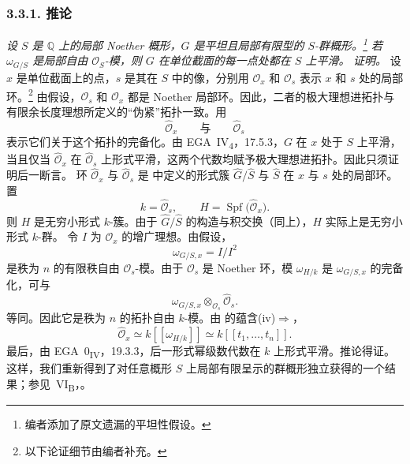 
\subsubsection*{3.3.1. 推论}
\label{sga3:VIIB:3.3.1}
{\itshape 设 \(S\) 是 \(\mathbb Q\) 上的局部 Noether 概形，\(G\) 是平坦且局部有限型的 \(S\)-群概形。\footnote{%
\label{sga3:VIIB:nde:129}编者添加了原文遗漏的平坦性假设。}
若 \(\omega_{G/S}\) 是局部自由 \(\mathcal O_S\)-模，则 \(G\) 在单位截面的每一点处都在 \(S\) 上平滑。}
\textit{证明。}
设 \(x\) 是单位截面上的点，\(s\) 是其在 \(S\) 中的像，分别用 \(\mathcal O_x\) 和 \(\mathcal O_s\) 表示 \(x\) 和 \(s\) 处的局部环。\footnote{%
\label{sga3:VIIB:nde:130}以下论证细节由编者补充。}
由假设，\(\mathcal O_s\) 和 \(\mathcal O_x\) 都是 Noether 局部环。因此，二者的极大理想进拓扑与有限余长度理想所定义的“伪紧”拓扑一致。用
\[
  \widehat{\mathcal O}_x
  \qquad\text{与}\qquad
  \widehat{\mathcal O}_s
\]
表示它们关于这个拓扑的完备化。由 EGA~IV\textsubscript{4}，17.5.3，\(G\) 在 \(x\) 处于 \(S\) 上平滑，当且仅当 \(\widehat{\mathcal O}_x\) 在 \(\widehat{\mathcal O}_s\) 上形式平滑，这两个代数均赋予极大理想进拓扑。因此只须证明后一断言。
环 \(\widehat{\mathcal O}_x\) 与 \(\widehat{\mathcal O}_s\) 是  中定义的形式簇 \(\widehat G/\widehat S\) 与 \(\widehat S\) 在 \(x\) 与 \(s\) 处的局部环。置
\[
  k=\widehat{\mathcal O}_s,
  \qquad
  H=\operatorname{Spf}\bigl(\widehat{\mathcal O}_x\bigr).
\]
则 \(H\) 是无穷小形式 \(k\)-簇。由于 \(\widehat G/\widehat S\) 的构造与积交换\textup{（同上）}，\(H\) 实际上是无穷小形式 \(k\)-群。
令 \(I\) 为 \(\mathcal O_x\) 的增广理想。由假设，
\[
  \omega_{G/S,x}=I/I^2
\]
是秩为 \(n\) 的有限秩自由 \(\mathcal O_s\)-模。由于 \(\mathcal O_s\) 是 Noether 环，模 \(\omega_{H/k}\) 是 \(\omega_{G/S,x}\) 的完备化，可与
\[
  \omega_{G/S,x}
  \otimes_{\mathcal O_s}
  \widehat{\mathcal O}_s.
\]
等同。因此它是秩为 \(n\) 的拓扑自由 \(k\)-模。由 的蕴含\textup{(iv)}\(\Rightarrow\)\textup{}，
\[
  \widehat{\mathcal O}_x
  \simeq
  k[[\omega_{H/k}]]
  \simeq
  k[[t_1,\ldots,t_n]].
\]
最后，由 EGA~0\textsubscript{IV}，19.3.3，后一形式幂级数代数在 \(k\) 上形式平滑。推论得证。
这样，我们重新得到了对任意概形 \(S\) 上局部有限呈示的群概形独立获得的一个结果；参见\ VI\textsubscript{B}，。
